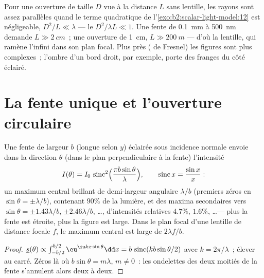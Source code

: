 \begin{remark}\label{rem:b2:diffraction:fresnelnumber}
Pour une ouverture de taille $D$ vue à la distance $L$ sans lentille, les
rayons sont assez parallèles quand le terme quadratique de
l'\cref{exo:b2:scalar-light-model:12} est négligeable, $D^2/L \ll \lambda$ ---
le \emph{} $D^2/\lambda L \ll 1$. Une fente de \qty{0.1}{mm} à
\qty{500}{nm} demande $L \gg \qty{2}{cm}$~; une ouverture de \qty{1}{cm}, $L \gg \qty{200}{m}$ ---
d'où la lentille, qui ramène l'infini dans son plan focal. Plus près
( de Fresnel) les figures sont plus complexes~; l'ombre d'un
bord droit, par exemple, porte des franges du côté éclairé.
\end{remark}

\section{La fente unique et l'ouverture circulaire}

\begin{proposition}\label{prop:b2:diffraction:slit}
Une fente de largeur $b$ (longue selon $y$) éclairée sous incidence normale envoie dans
la direction $\theta$ (dans le plan perpendiculaire à la fente)
l'intensité
\[
I(\theta) = I_0\,\operatorname{sinc}^2\Bigl(\frac{\pi b\sin\theta}\lambda\Bigr) , \qquad \operatorname{sinc}x = \frac{\sin x}x :
\]
un maximum central brillant de demi-largeur angulaire $\lambda/b$ (premiers zéros en
$\sin\theta = \pm\lambda/b$), contenant $90\%$ de la lumière, et des maxima secondaires
vers $\sin\theta = \pm1.43\lambda/b$, $\pm2.46\lambda/b$, \dots, d'intensités
relatives $4.7\%$, $1.6\%$, \dots --- plus la fente est étroite, plus
la figure est large. Dans le plan focal d'une lentille de distance focale $f$, le
maximum central est large de $2\lambda f/b$.
\end{proposition}

\begin{proof}
$\underline s(\theta) \propto \int_{-b/2}^{b/2}\eu^{\iu kx\sin\theta}\dd x = b\,\operatorname{sinc}(kb\sin\theta/2)$
avec $k = 2\pi/\lambda$~; élever au carré. Zéros là où $b\sin\theta = m\lambda$, $m \ne 0$~: les
ondelettes des deux moitiés de la fente s'annulent alors deux à deux.
\end{proof}

